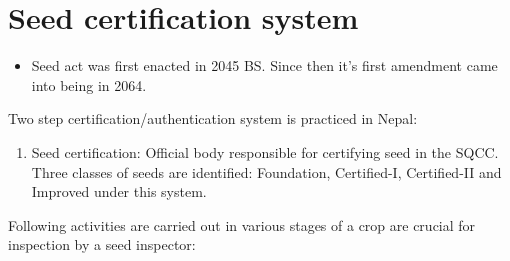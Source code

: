 \documentclass[
  openany]{book}
\providecommand{\tightlist}{%
  \setlength{\itemsep}{0pt}\setlength{\parskip}{0pt}}
\begin{document}
\hypertarget{seed-certification-system}{%
\section{Seed certification system}\label{seed-certification-system}}

\begin{itemize}
\tightlist
\item
  Seed act was first enacted in 2045 BS. Since then it's first amendment came into being in 2064.
\end{itemize}

Two step certification/authentication system is practiced in Nepal:

\begin{enumerate}
\def\labelenumi{\arabic{enumi}.}
\tightlist
\item
  Seed certification: Official body responsible for certifying seed in the SQCC. Three classes of seeds are identified: Foundation, Certified-I, Certified-II and Improved under this system.
\end{enumerate}

Following activities are carried out in various stages of a crop are crucial for inspection by a seed inspector:
\end{document}
